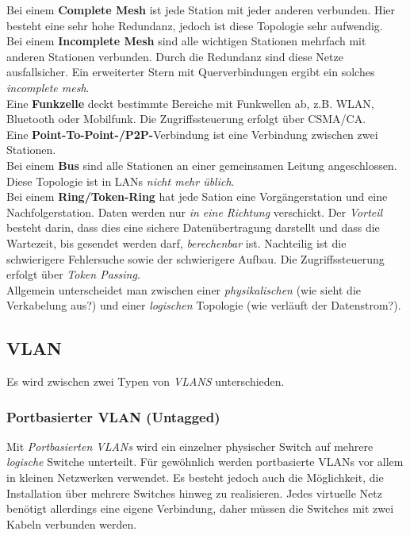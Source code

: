 \documentclass[a4paper, 12pt]{report}
\begin{document}
Bei einem \textbf{Complete Mesh} ist jede Station mit jeder anderen verbunden. 
Hier besteht eine sehr hohe Redundanz, jedoch ist diese Topologie sehr 
aufwendig. \\

Bei einem \textbf{Incomplete Mesh} sind alle wichtigen Stationen mehrfach mit 
anderen Stationen verbunden. Durch die Redundanz sind diese Netze ausfallsicher.
Ein erweiterter Stern mit Querverbindungen ergibt ein solches \emph{incomplete 
mesh}. \\

Eine \textbf{Funkzelle} deckt bestimmte Bereiche  mit Funkwellen ab, z.B. 
WLAN, Bluetooth oder Mobilfunk. Die Zugriffssteuerung erfolgt über CSMA/CA. \\

Eine \textbf{Point-To-Point-/P2P-}Verbindung ist eine Verbindung zwischen zwei
Stationen. \\

Bei einem \textbf{Bus} sind alle Stationen an einer gemeinsamen Leitung 
angeschlossen. Diese Topologie ist in LANs \emph{nicht mehr üblich}. \\

Bei einem \textbf{Ring/Token-Ring} hat jede Sation eine Vorgängerstation und 
eine Nachfolgerstation. Daten werden nur \emph{in eine Richtung} verschickt. 
Der \emph{Vorteil} besteht darin, dass dies eine sichere Datenübertragung 
darstellt und dass die Wartezeit, bis gesendet werden darf, \emph{berechenbar} 
ist. Nachteilig ist die schwierigere Fehlersuche sowie der schwierigere Aufbau. 
Die Zugriffssteuerung erfolgt über \emph{Token Passing}. \\

Allgemein unterscheidet man zwischen einer \emph{physikalischen} (wie sieht die 
Verkabelung aus?) und einer \emph{logischen} Topologie (wie verläuft der 
Datenstrom?). 

\subsection{VLAN}

Es wird zwischen zwei Typen von \emph{VLANS} unterschieden. 


\subsubsection{Portbasierter VLAN (Untagged)}

Mit \emph{Portbasierten VLANs} wird ein einzelner physischer Switch auf mehrere
\emph{logische} Switche unterteilt. Für gewöhnlich werden portbasierte VLANs vor
allem in kleinen Netzwerken verwendet. Es besteht jedoch auch die Möglichkeit, 
die Installation über mehrere Switches hinweg zu realisieren. Jedes virtuelle 
Netz benötigt allerdings eine eigene Verbindung, daher müssen die Switches mit 
zwei Kabeln verbunden werden. 
\end{document}
